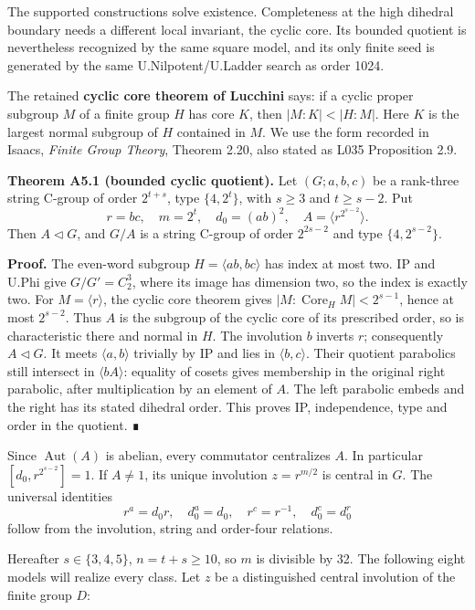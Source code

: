 \documentclass[
  11pt,
  a4paper,
]{article}
\begin{document}
The supported constructions solve existence. Completeness at the high
dihedral boundary needs a different local invariant, the cyclic core.
Its bounded quotient is nevertheless recognized by the same square
model, and its only finite seed is generated by the same
U.Nilpotent/U.Ladder search as order 1024.

The retained \textbf{cyclic core theorem of Lucchini} says: if a cyclic
proper subgroup \(M\) of a finite group \(H\) has core \(K\), then
\(|M:K|<|H:M|\). Here \(K\) is the largest normal subgroup of \(H\)
contained in \(M\). We use the form recorded in Isaacs, \emph{Finite
Group Theory}, Theorem 2.20, also stated as L035 Proposition 2.9.

\textbf{Theorem A5.1 (bounded cyclic quotient).} Let \((G;a,b,c)\) be a
rank-three string C-group of order \(2^{t+s}\), type \(\{4,2^t\}\), with
\(s\ge3\) and \(t\ge s-2\). Put \[
 r=bc,\quad m=2^t,\quad d_0=(ab)^2,\quad
 A=\langle r^{2^{s-2}}\rangle.
\] Then \(A\lhd G\), and \(G/A\) is a string C-group of order
\(2^{2s-2}\) and type \(\{4,2^{s-2}\}\).

\textbf{Proof.} The even-word subgroup \(H=\langle ab,bc\rangle\) has
index at most two. IP and U.Phi give \(G/G'=C_2^3\), where its image has
dimension two, so the index is exactly two. For \(M=\langle r\rangle\),
the cyclic core theorem gives \(|M:\operatorname{Core}_H M|<2^{s-1}\),
hence at most \(2^{s-2}\). Thus \(A\) is the subgroup of the cyclic core
of its prescribed order, so is characteristic there and normal in \(H\).
The involution \(b\) inverts \(r\); consequently \(A\lhd G\). It meets
\(\langle a,b\rangle\) trivially by IP and lies in
\(\langle b,c\rangle\). Their quotient parabolics still intersect in
\(\langle bA\rangle\): equality of cosets gives membership in the
original right parabolic, after multiplication by an element of \(A\).
The left parabolic embeds and the right has its stated dihedral order.
This proves IP, independence, type and order in the quotient. ∎

Since \(\operatorname{Aut}(A)\) is abelian, every commutator centralizes
\(A\). In particular \([d_0,r^{2^{s-2}}]=1\). If \(A\ne1\), its unique
involution \(z=r^{m/2}\) is central in \(G\). The universal identities
\[
 r^a=d_0r,\quad d_0^a=d_0,\quad r^c=r^{-1},\quad d_0^c=d_0^r       \tag{A-C1}
\] follow from the involution, string and order-four relations.

Hereafter \(s\in\{3,4,5\}\), \(n=t+s\ge10\), so \(m\) is divisible by
32. The following eight models will realize every class. Let \(z\) be a
distinguished central involution of the finite group \(D\):
\end{document}
